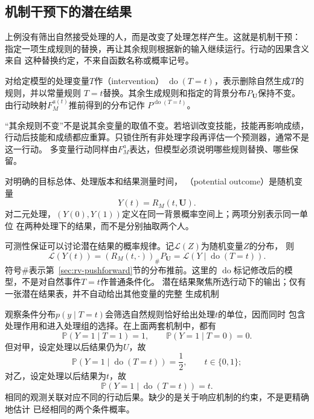 \subsection{机制干预下的潜在结果}
\label{sec:causal-intervention-potential-outcomes}

上例没有筛出自然接受处理的人，而是改变了处理怎样产生。这就是机制干预：
指定一项生成规则的替换，再让其余规则根据新的输入继续运行。行动的因果含义来自
这种替换约定，不来自函数名称或概率记号。

\begin{definition}[理想干预]
  \label{def:causal-intervention}
  对给定模型的处理变量\(T\)作（intervention）
  \(\operatorname{do}(T=t)\)，表示删除自然生成\(T\)的规则，并以常量规则
  \(T=t\)替换。其余生成规则和指定的背景分布\(P_{\bm U}\)保持不变。
  由行动映射\(F_M^{a(t)}\)推前得到的分布记作
  \(P^{\operatorname{do}(T=t)}\)。
\end{definition}

“其余规则不变”不是说其余变量的取值不变。若培训改变技能，技能再影响成绩，
行动后技能和成绩都应重算。只锁住所有非处理字段再评估一个预测器，通常不是这一行动。
多变量行动同样由\(F_M^a\)表达，但模型必须说明哪些规则替换、哪些保留。

\begin{definition}[潜在结果]
  \label{def:causal-potential-outcomes}
  对明确的目标总体、处理版本和结果测量时间，
  （potential outcome）是随机变量
  \begin{equation}
    Y(t)=R_M(t,\bm U).
    \label{eq:causal-response-potential-outcome}
  \end{equation}
  对二元处理，\((Y(0),Y(1))\)定义在同一背景概率空间上；两项分别表示同一单位
  在两种处理下的结果，而不是分别抽取两个人。
\end{definition}

可测性保证可以讨论潜在结果的概率规律。记\(\mathcal L(Z)\)为随机变量\(Z\)的分布，
则
\[
  \mathcal L(Y(t))
  =
  (R_M(t,\cdot))_{\#}P_{\bm U}
  =
  \mathcal L(Y\mid\operatorname{do}(T=t)).
\]
符号\(\#\)表示第~\ref{sec:rv-pushforward}节的分布推前。这里的
\(\operatorname{do}\)标记修改后的模型，不是对自然事件\(T=t\)作普通条件化。
潜在结果聚焦所选行动下的输出；仅有一张潜在结果表，并不自动给出其他变量的完整
生成机制

观察条件分布\(p(y\mid T=t)\)会筛选自然规则恰好给出处理\(t\)的单位，因而同时
包含处理作用和进入处理组的选择。在上面两套机制中，都有
\[
  \mathbb P(Y=1\mid T=1)=1,\qquad
  \mathbb P(Y=1\mid T=0)=0.
\]
但对甲，设定处理以后结果仍为\(U\)，故
\[
  \mathbb P(Y=1\mid\operatorname{do}(T=t))=\frac12,
  \qquad t\in\{0,1\};
\]
对乙，设定处理以后结果为\(t\)，故
\[
  \mathbb P(Y=1\mid\operatorname{do}(T=t))=t.
\]
相同的观测关联对应不同的行动后果。缺少的是关于响应机制的约束，不是更精确地估计
已经相同的两个条件概率。

